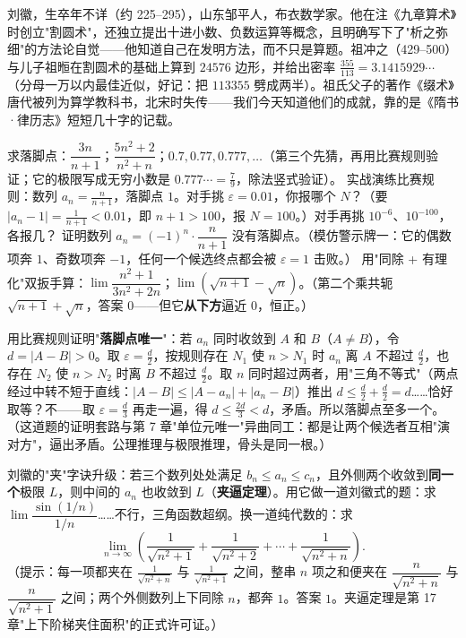 \begin{lishi}
刘徽，生卒年不详（约 225--295），山东邹平人，布衣数学家。他在注《九章算术》时创立"割圆术"，还独立提出十进小数、负数运算等概念，且明确写下了"析之弥细"的方法论自觉——他知道自己在发明方法，而不只是算题。祖冲之（429--500）与儿子祖暅在割圆术的基础上算到 $24576$ 边形，并给出密率 $\tfrac{355}{113} = 3.1415929\cdots$（分母一万以内最佳近似，好记：把 $113355$ 劈成两半）。祖氏父子的著作《缀术》唐代被列为算学教科书，北宋时失传——我们今天知道他们的成就，靠的是《隋书·律历志》短短几十字的记载。
\end{lishi}

\begin{dongshou}
\begin{itemize}
  \yisi 求落脚点：$\dfrac{3n}{n+1}$；$\dfrac{5n^2+2}{n^2+n}$；$0.7, 0.77, 0.777, \dots$（第三个先猜，再用比赛规则验证；它的极限写成无穷小数是 $0.777\cdots = \tfrac79$，除法竖式验证）。
  \yier 实战演练比赛规则：数列 $a_n = \tfrac{n}{n+1}$，落脚点 $1$。对手挑 $\varepsilon = 0.01$，你报哪个 $N$？（要 $|a_n - 1| = \tfrac{1}{n+1} < 0.01$，即 $n+1 > 100$，报 $N = 100$。）对手再挑 $10^{-6}$、$10^{-100}$，各报几？
  \yier 证明数列 $a_n = (-1)^n\cdot\dfrac{n}{n+1}$ 没有落脚点。（模仿警示牌一：它的偶数项奔 $1$、奇数项奔 $-1$，任何一个候选终点都会被 $\varepsilon = 1$ 击败。）
  \yier 用"同除 + 有理化"双扳手算：$\lim \dfrac{n^2+1}{3n^2+2n}$；$\lim\left(\sqrt{n+1} - \sqrt n\right)$。（第二个乘共轭 $\sqrt{n+1}+\sqrt n$，答案 $0$——但它\textbf{从下方}逼近 $0$，恒正。）
\end{itemize}
\end{dongshou}

\begin{shaonao}
用比赛规则证明"\textbf{落脚点唯一}"：若 $a_n$ 同时收敛到 $A$ 和 $B$（$A \ne B$），令 $d = |A - B| > 0$。取 $\varepsilon = \tfrac d2$，按规则存在 $N_1$ 使 $n > N_1$ 时 $a_n$ 离 $A$ 不超过 $\tfrac d2$，也存在 $N_2$ 使 $n > N_2$ 时离 $B$ 不超过 $\tfrac d2$。取 $n$ 同时超过两者，用"三角不等式"（两点经过中转不短于直线：$|A - B| \le |A - a_n| + |a_n - B|$）推出 $d \le \tfrac d2 + \tfrac d2 = d$……恰好取等？不——取 $\varepsilon = \tfrac d3$ 再走一遍，得 $d \le \tfrac{2d}3 < d$，矛盾。所以落脚点至多一个。（这道题的证明套路与第 7 章"单位元唯一"异曲同工：都是让两个候选者互相"演对方"，逼出矛盾。公理推理与极限推理，骨头是同一根。）
\end{shaonao}

\begin{shaonao}
刘徽的"夹"字诀升级：若三个数列处处满足 $b_n \le a_n \le c_n$，且外侧两个收敛到\textbf{同一个}极限 $L$，则中间的 $a_n$ 也收敛到 $L$（\textbf{夹逼定理}）。用它做一道刘徽式的题：求 $\lim \dfrac{\sin(1/n)}{1/n}$……不行，三角函数超纲。换一道纯代数的：求
\[
\lim_{n\to\infty} \left(\frac{1}{\sqrt{n^2+1}} + \frac{1}{\sqrt{n^2+2}} + \cdots + \frac{1}{\sqrt{n^2+n}}\right) .
\]
（提示：每一项都夹在 $\tfrac{1}{\sqrt{n^2+n}}$ 与 $\tfrac{1}{\sqrt{n^2+1}}$ 之间，整串 $n$ 项之和便夹在 $\dfrac{n}{\sqrt{n^2+n}}$ 与 $\dfrac{n}{\sqrt{n^2+1}}$ 之间；两个外侧数列上下同除 $n$，都奔 $1$。答案 $1$。夹逼定理是第 17 章"上下阶梯夹住面积"的正式许可证。）
\end{shaonao}

